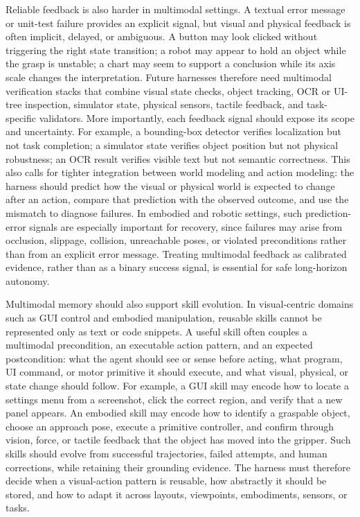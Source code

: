 \documentclass{llmxive}
\begin{document}
Reliable feedback is also harder in multimodal settings. A textual error message or unit-test failure provides an explicit signal, but visual and physical feedback is often implicit, delayed, or ambiguous. A button may look clicked without triggering the right state transition; a robot may appear to hold an object while the grasp is unstable; a chart may seem to support a conclusion while its axis scale changes the interpretation. Future harnesses therefore need multimodal verification stacks that combine visual state checks, object tracking, OCR or UI-tree inspection, simulator state, physical sensors, tactile feedback, and task-specific validators. More importantly, each feedback signal should expose its scope and uncertainty. For example, a bounding-box detector verifies localization but not task completion; a simulator state verifies object position but not physical robustness; an OCR result verifies visible text but not semantic correctness. This also calls for tighter integration between world modeling and action modeling: the harness should predict how the visual or physical world is expected to change after an action, compare that prediction with the observed outcome, and use the mismatch to diagnose failures. In embodied and robotic settings, such prediction-error signals are especially important for recovery, since failures may arise from occlusion, slippage, collision, unreachable poses, or violated preconditions rather than from an explicit error message. Treating multimodal feedback as calibrated evidence, rather than as a binary success signal, is essential for safe long-horizon autonomy.

Multimodal memory should also support skill evolution. In visual-centric domains such as GUI control and embodied manipulation, reusable skills cannot be represented only as text or code snippets. A useful skill often couples a multimodal precondition, an executable action pattern, and an expected postcondition: what the agent should see or sense before acting, what program, UI command, or motor primitive it should execute, and what visual, physical, or state change should follow. For example, a GUI skill may encode how to locate a settings menu from a screenshot, click the correct region, and verify that a new panel appears. An embodied skill may encode how to identify a graspable object, choose an approach pose, execute a primitive controller, and confirm through vision, force, or tactile feedback that the object has moved into the gripper. Such skills should evolve from successful trajectories, failed attempts, and human corrections, while retaining their grounding evidence. The harness must therefore decide when a visual-action pattern is reusable, how abstractly it should be stored, and how to adapt it across layouts, viewpoints, embodiments, sensors, or tasks.
\end{document}
